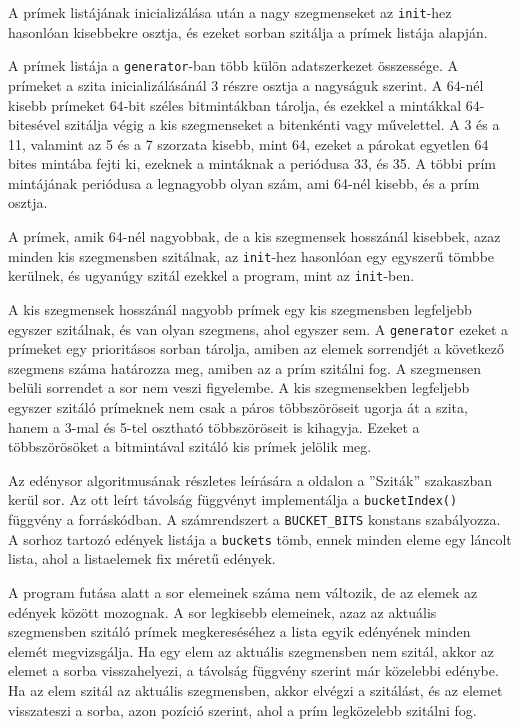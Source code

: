 A prímek listájának inicializálása után a nagy szegmenseket az \texttt{init}-hez hasonlóan kisebbekre osztja, és ezeket sorban szitálja a prímek listája alapján.

A prímek listája a \texttt{generator}-ban több külön adatszerkezet összessége.
A prímeket a szita inicializálásánál 3 részre osztja a nagyságuk szerint.
A $64$-nél kisebb prímeket $64$-bit széles bitmintákban tárolja, és ezekkel a mintákkal $64$-bitesével szitálja végig a kis szegmenseket a bitenkénti vagy művelettel.
A 3 és a 11, valamint az 5 és a 7 szorzata kisebb, mint 64, ezeket a párokat egyetlen $64$ bites mintába fejti ki, ezeknek a mintáknak a periódusa 33, és 35.
A többi prím mintájának periódusa a legnagyobb olyan szám, ami 64-nél kisebb, és a prím osztja.

A prímek, amik $64$-nél nagyobbak, de a kis szegmensek hosszánál kisebbek, azaz minden kis szegmensben szitálnak, az \texttt{init}-hez hasonlóan egy egyszerű tömbbe kerülnek, és ugyanúgy szitál ezekkel a program, mint az \texttt{init}-ben.

A kis szegmensek hosszánál nagyobb prímek egy kis szegmensben legfeljebb egyszer szitálnak, és van olyan szegmens, ahol egyszer sem.
A \texttt{generator} ezeket a prímeket egy prioritásos sorban tárolja, amiben az elemek sorrendjét a következő szegmens száma határozza meg, amiben az a prím szitálni fog.
A szegmensen belüli sorrendet a sor nem veszi figyelembe.
A kis szegmensekben legfeljebb egyszer szitáló prímeknek nem csak a páros többszöröseit ugorja át a szita, hanem a 3-mal és 5-tel osztható többszöröseit is kihagyja.
Ezeket a többszörösöket a bitmintával szitáló kis prímek jelölik meg.

Az edénysor algoritmusának részletes leírására a \pageref{sec:szitak} oldalon a ''Sziták'' szakaszban kerül sor.
Az ott leírt távolság függvényt implementálja a \texttt{bucketIndex()} függvény a forráskódban.
A számrendszert a \texttt{BUCKET\_BITS} konstans szabályozza.
A sorhoz tartozó edények listája a \texttt{buckets} tömb, ennek minden eleme egy láncolt lista, ahol a listaelemek fix méretű edények.

A program futása alatt a sor elemeinek száma nem változik, de az elemek az edények között mozognak.
A sor legkisebb elemeinek, azaz az aktuális szegmensben szitáló prímek megkereséséhez a lista egyik edényének minden elemét megvizsgálja.
Ha egy elem az aktuális szegmensben nem szitál, akkor az elemet a sorba visszahelyezi, a távolság függvény szerint már közelebbi edénybe.
Ha az elem szitál az aktuális szegmensben, akkor elvégzi a szitálást, és az elemet visszateszi a sorba, azon pozíció szerint, ahol a prím legközelebb szitálni fog.

